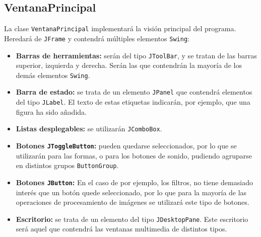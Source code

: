 \subsection{VentanaPrincipal}
La clase \texttt{VentanaPrincipal} implementará la visión principal del programa. Heredará de \texttt{JFrame} y contendrá múltiples elementos \texttt{Swing}:
\begin{itemize}
\item{\textbf{Barras de herramientas:} serán del tipo \texttt{JToolBar}, y se tratan de las barras superior, izquierda y derecha. Serán las que contendrán la mayoría de los demás elementos \texttt{Swing}.}
\item{\textbf{Barra de estado:} se trata de un elemento \texttt{JPanel} que contendrá elementos del tipo \texttt{JLabel}. El texto de estas etiquetas indicarán, por ejemplo, que una figura ha sido añadida.}
\item{\textbf{Listas desplegables:} se utilizarán \texttt{JComboBox}.}
\item{\textbf{Botones \texttt{JToggleButton}:} pueden quedarse seleccionados, por lo que se utilizarán para las formas, o para los botones de sonido, pudiendo agruparse en distintos grupos \texttt{ButtonGroup}.}
\item{\textbf{Botones \texttt{JButton}:} En el caso de por ejemplo, los filtros, no tiene demasiado interés que un botón quede seleccionado, por lo que para la mayoría de las operaciones de procesamiento de imágenes se utilizará este tipo de botones.}
\item{\textbf{Escritorio:} se trata de un elemento del tipo \texttt{JDesktopPane}. Este escritorio será aquel que contendrá las ventanas multimedia de distintos tipos.}
\end{itemize}
